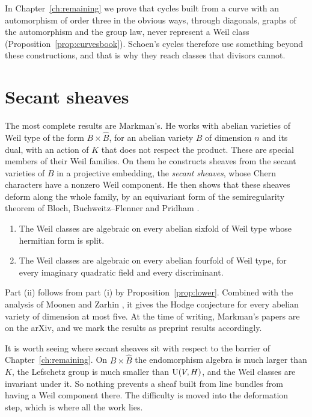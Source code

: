 In Chapter~\ref{ch:remaining} we prove that cycles built from a curve with
an automorphism of order three in the obvious ways, through diagonals,
graphs of the automorphism and the group law, never represent a Weil class
(Proposition~\ref{prop:curvesbook}). Schoen's cycles therefore use something
beyond these constructions, and that is why they reach classes that divisors
cannot.

\section{Secant sheaves}

The most complete results are Markman's. He works with abelian varieties of
Weil type of the form $B\times\widehat B$, for an abelian variety $B$ of
dimension $n$ and its dual, with an action of $K$ that does not respect the
product. These are special members of their Weil families. On them he
constructs sheaves from the secant varieties of $B$ in a projective
embedding, the \emph{secant sheaves}, whose Chern characters have a nonzero
Weil component. He then shows that these sheaves deform along the whole
family, by an equivariant form of the semiregularity theorem of Bloch,
Buchweitz--Flenner and Pridham \cite{Blo72,BF03,Pri24}.

\begin{theorem}\label{thm:markman}
\begin{enumerate}[label=(\roman*)]
\item The Weil classes are algebraic on every abelian sixfold of Weil type
whose hermitian form is split.
\item The Weil classes are algebraic on every abelian fourfold of Weil
type, for every imaginary quadratic field and every discriminant.
\end{enumerate}
\end{theorem}

Part (ii) follows from part (i) by Proposition~\ref{prop:lower}. Combined with
the analysis of Moonen and Zarhin \cite{MZ99}, it gives the Hodge
conjecture for every abelian variety of dimension at most five. At the time
of writing, Markman's papers are on the arXiv, and we mark the results as
preprint results accordingly.

It is worth seeing where secant sheaves sit with respect to the barrier of
Chapter~\ref{ch:remaining}. On $B\times\widehat B$ the endomorphism algebra is
much larger than $K$, the Lefschetz group is much smaller than $\operatorname{U}(V,H)$, and
the Weil classes are invariant under it. So nothing prevents a sheaf built
from line bundles from having a Weil component there. The difficulty is
moved into the deformation step, which is where all the work lies.

